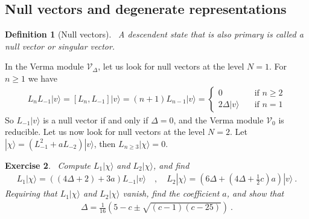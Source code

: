 \documentclass[12pt, a4paper]{article}
\theoremstyle{break}
\newtheorem{exo}{Exercise}[section]
\newtheorem{defn}[exo]{Definition}
\begin{document}
\subsection{Null vectors and degenerate representations}\label{sec:nv}

\begin{defn}[Null vectors]
 ~\label{def:nv}
 A descendent state that is also primary is called a null vector or singular vector.
\end{defn}

In the Verma module $\mathcal V_\Delta$, let us look for null vectors at the level $N=1$. For $n\geq 1$ we have 
\begin{align}
L_n L_{-1}|v\rangle = [L_n, L_{-1}] |v\rangle = (n+1) L_{n-1}|v\rangle = 
\left\{\begin{array}{ll} 0 &  \quad \text{if } n\geq 2 \\ 2\Delta |v\rangle & \quad \text{if } n = 1 \end{array}\right. 
\end{align}
So $L_{-1}|v\rangle$ is a null vector if and only if $\Delta=0$, and the Verma module $\mathcal V_0$ is reducible.
Let us now look for null vectors at the level $N=2$. Let $|\chi\rangle = (L_{-1}^2 + a L_{-2})|v\rangle$, then $L_{n\geq 3} |\chi \rangle =0$. 

\begin{exo}
 ~\label{exo:level2}
 Compute  $L_1|\chi\rangle$ and $L_2|\chi\rangle$, and find 
 \begin{align}
  L_1 |\chi\rangle = \left((4\Delta+2) + 3a\right) L_{-1}|v\rangle
  \quad , \quad L_2 |\chi\rangle= \left(6\Delta + (4\Delta +\tfrac12 c)a\right) |v\rangle\ .
 \end{align}
 Requiring that $L_1|\chi\rangle$ and $L_2|\chi\rangle$ vanish, find the coefficient $a$, and show that
 \begin{align}
 \Delta = \frac{1}{16}\left( 5-c\pm\sqrt{(c-1)(c-25)} \right) \ .
 \label{eq:dpm}
\end{align}
\end{exo}
\end{document}
